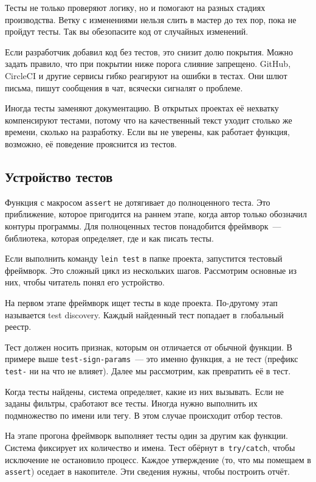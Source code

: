 
Тесты не только проверяют логику, но и помогают на разных стадиях
производства. Ветку с изменениями нельзя слить в мастер до тех пор, пока не
пройдут тесты. Так вы обезопасите код от случайных изменений.

Если разработчик добавил код без тестов, это снизит долю покрытия. Можно задать
правило, что при покрытии ниже порога слияние запрещено. GitHub, CircleCI и
другие сервисы гибко реагируют на ошибки в тестах. Они шлют письма, пишут
сообщения в чат, всячески сигналят о проблеме.

Иногда тесты заменяют документацию. В открытых проектах её нехватку компенсируют
тестами, потому что на качественный текст уходит столько же времени, сколько на
разработку. Если вы не уверены, как работает функция, возможно, её поведение
прояснится из тестов.

\subsection{Устройство тестов}

Функция с макросом \verb|assert| не дотягивает до полноценного теста. Это
приближение, которое пригодится на раннем этапе, когда автор только обозначил
контуры программы. Для полноценных тестов понадобится фреймворк~--- библиотека,
которая определяет, где и как писать тесты.

Если выполнить команду \verb|lein test| в папке проекта, запустится тестовый
фреймворк. Это сложный цикл из нескольких шагов. Рассмотрим основные из них,
чтобы читатель понял его устройство.

На первом этапе фреймворк ищет тесты в коде проекта. По-другому этап называется
test discovery. Каждый найденный тест попадает в~глобальный реестр.

Тест должен носить признак, которым он отличается от обычной функции. В примере
выше \verb|test-sign-params|~--- это именно функция, а~не тест (префикс \verb|test-|
ни на что не влияет). Далее мы рассмотрим, как превратить её в тест.

Когда тесты найдены, система определяет, какие из них вызывать. Если не заданы
фильтры, сработают все тесты. Иногда нужно выполнить их подмножество по имени
или тегу. В этом случае происходит отбор тестов.

На этапе прогона фреймворк выполняет тесты один за другим как функции. Система
фиксирует их количество и имена. Тест обёрнут в~\verb|try/catch|, чтобы
исключение не остановило процесс. Каждое утверждение (то, что мы помещаем в
\verb|assert|) оседает в накопителе. Эти сведения нужны, чтобы построить отчёт.


